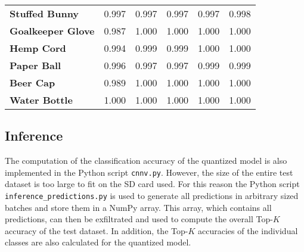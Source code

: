 \begin{table}
\begin{tabular}{llllll}
    \textbf{Stuffed Bunny} & \num{0.997} & \num{0.997} & \num{0.997} & \num{0.997} & \num{0.998} \\
    \textbf{Goalkeeper Glove} & \num{0.987} & \num{1.000} & \num{1.000} & \num{1.000} & \num{1.000} \\
    \textbf{Hemp Cord} & \num{0.994} & \num{0.999} & \num{0.999} & \num{1.000} & \num{1.000} \\
    \textbf{Paper Ball} & \num{0.996} & \num{0.997} & \num{0.997} & \num{0.999} & \num{0.999} \\
    \textbf{Beer Cap} & \num{0.989} & \num{1.000} & \num{1.000} & \num{1.000} & \num{1.000} \\
    \textbf{Water Bottle} & \num{1.000} & \num{1.000} & \num{1.000} & \num{1.000} & \num{1.000} \\
    \bottomrule
  \end{tabular}
\end{table}

\subsection{Inference}
\label{subsec:verification_and_benchmark:classification_performance:inference}

The computation of the classification accuracy of the quantized model is also implemented in the Python script \texttt{cnnv.py}.
However, the size of the entire test dataset is too large to fit on the SD card used.
For this reason the Python script \texttt{inference\_predictions.py} is used to generate all predictions in arbitrary sized batches and store them in a NumPy array.
This array, which contains all predictions, can then be exfiltrated and used to compute the overall Top-$K$ accuracy of the test dataset.
In addition, the Top-$K$ accuracies of the individual classes are also calculated for the quantized model.

